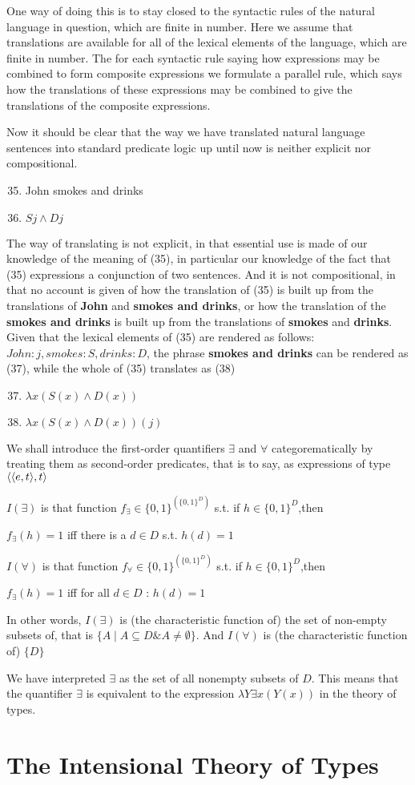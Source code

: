 \documentclass[11pt]{article}
\begin{document}
One way of doing this is to stay closed to the syntactic rules of the
natural language in question, which are finite in number. Here we assume
that translations are available for all of the lexical elements of the
language, which are finite in number. The for each syntactic rule saying how
expressions may be combined to form composite expressions we formulate a
parallel rule, which says how the translations of these expressions may be
combined to give the translations of the composite expressions.

Now it should be clear that the way we have translated natural language
sentences into standard predicate logic up until now is neither explicit nor
compositional.
\begin{enumerate}
\setcounter{enumi}{34}
\item John smokes and drinks
\item \(Sj\wedge Dj\)
\end{enumerate}


The way of translating is not explicit, in that essential use is made of our
knowledge of the meaning of (35), in particular our knowledge of the fact
that (35) expressions a conjunction of two sentences. And it is not
compositional, in that no account is given of how the translation of (35) is
built up from the translations of \textbf{John} and \textbf{smokes and drinks}, or how the
translation of the \textbf{smokes and drinks} is built up from the translations of
\textbf{smokes} and \textbf{drinks}. Given that the lexical elements of (35) are rendered as
follows: \(John:j,smokes:S,drinks:D\), the phrase \textbf{smokes and drinks} can be
rendered as (37), while the whole of (35) translates as (38)
\begin{enumerate}
\setcounter{enumi}{36}
\item \(\lambda x(S(x)\wedge D(x))\)
\item \(\lambda x(S(x)\wedge D(x))(j)\)
\end{enumerate}


We shall introduce the first-order quantifiers \(\exists\) and \(\forall\)
categorematically by treating them as second-order predicates, that is to
say, as expressions of type \(\langle\langle e,t\rangle,t\rangle\)
\begin{center}
\(I(\exists)\) is that function \(f_{\exists}\in\{0,1\}^{(\{0,1\}^D)}\) s.t.
if \(h\in\{0,1\}^D\),then \par
\(f_\exists(h)=1\) iff there is a \(d\in D\) s.t. \(h(d)=1\) \par
\(I(\forall)\) is that function \(f_{\forall}\in\{0,1\}^{(\{0,1\}^D)}\) s.t.
if \(h\in\{0,1\}^D\),then \par
\(f_\exists(h)=1\) iff for all \(d\in D\) : \(h(d)=1\) 
\end{center}
In other words, \(I(\exists)\) is (the characteristic function of) the set
of non-empty subsets of, that is \(\{A\mid A\subseteq D\&A\neq\emptyset\}\).
And \(I(\forall)\) is (the characteristic function of) \(\{D\}\)

We have interpreted \(\exists\) as the set of all nonempty subsets of \(D\).
This means that the quantifier \(\exists\) is equivalent to the expression
\(\lambda Y\exists x(Y(x))\) in the theory of types.
\section{The Intensional Theory of Types}
\label{sec:org7b3a94a}
\end{document}
